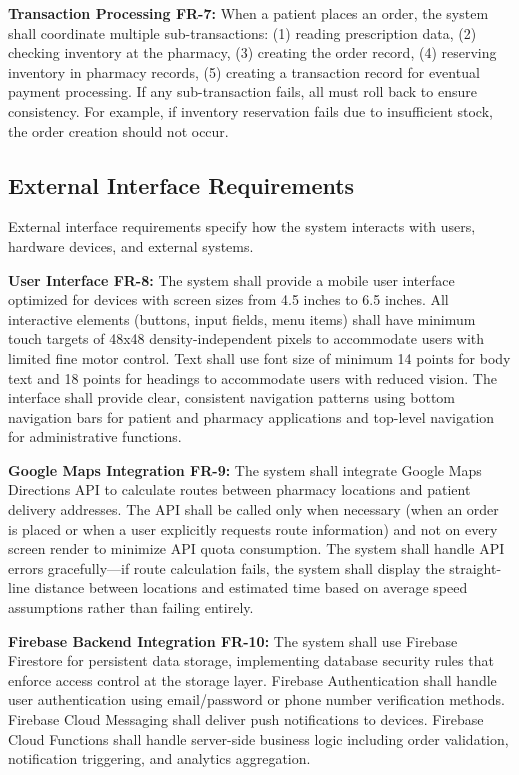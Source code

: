 \documentclass[12pt,a4paper]{report}
\begin{document}
\textbf{Transaction Processing FR-7:} When a patient places an order, the system shall coordinate multiple sub-transactions: (1) reading prescription data, (2) checking inventory at the pharmacy, (3) creating the order record, (4) reserving inventory in pharmacy records, (5) creating a transaction record for eventual payment processing. If any sub-transaction fails, all must roll back to ensure consistency. For example, if inventory reservation fails due to insufficient stock, the order creation should not occur.

\subsection{External Interface Requirements}

External interface requirements specify how the system interacts with users, hardware devices, and external systems.

\textbf{User Interface FR-8:} The system shall provide a mobile user interface optimized for devices with screen sizes from 4.5 inches to 6.5 inches. All interactive elements (buttons, input fields, menu items) shall have minimum touch targets of 48x48 density-independent pixels to accommodate users with limited fine motor control. Text shall use font size of minimum 14 points for body text and 18 points for headings to accommodate users with reduced vision. The interface shall provide clear, consistent navigation patterns using bottom navigation bars for patient and pharmacy applications and top-level navigation for administrative functions.

\textbf{Google Maps Integration FR-9:} The system shall integrate Google Maps Directions API to calculate routes between pharmacy locations and patient delivery addresses. The API shall be called only when necessary (when an order is placed or when a user explicitly requests route information) and not on every screen render to minimize API quota consumption. The system shall handle API errors gracefully—if route calculation fails, the system shall display the straight-line distance between locations and estimated time based on average speed assumptions rather than failing entirely.

\textbf{Firebase Backend Integration FR-10:} The system shall use Firebase Firestore for persistent data storage, implementing database security rules that enforce access control at the storage layer. Firebase Authentication shall handle user authentication using email/password or phone number verification methods. Firebase Cloud Messaging shall deliver push notifications to devices. Firebase Cloud Functions shall handle server-side business logic including order validation, notification triggering, and analytics aggregation.
\end{document}
